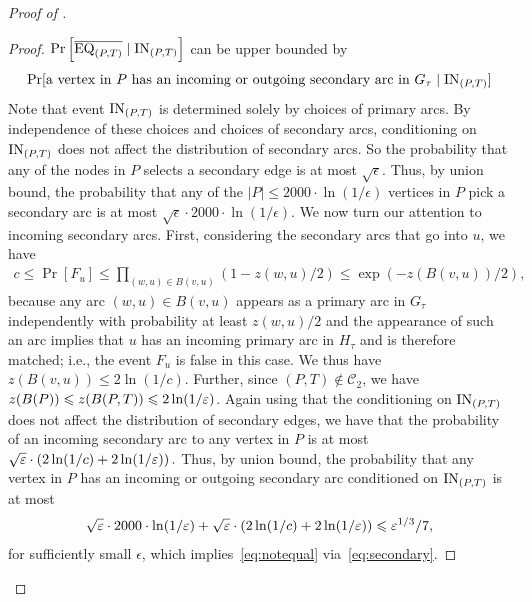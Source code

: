 \begin{proof}[Proof of ]
\begin{proof}
		$\Pr\left[\overline{\mathrm{EQ}_{(P,T)}}\mid \mathrm{IN}_{(P,T)}\right]$ can be upper bounded by
		\begin{align}
		\Pr[\mbox{a vertex in $P$ has an incoming or outgoing secondary arc in $G_\tau$} \mid \mathrm{IN}_{(P,T)}]
		\label{eq:secondary}
		\end{align}
		Note that event $\mathrm{IN}_{(P,T)}$ is determined solely by choices of primary arcs. By independence of these choices and choices of secondary arcs, conditioning on $\mathrm{IN}_{(P,T)}$ does not affect the distribution of secondary arcs. So the probability that any of the nodes in $P$ selects a secondary edge is at most $\sqrt{\epsilon}$. Thus, by union bound, the probability that any of the $|P|\leq 2000 \cdot \ln(1/\epsilon)$ vertices in $P$ pick a secondary arc is at most $\sqrt{\epsilon}\cdot 2000 \cdot \ln(1/\epsilon)$. We now turn our attention to incoming secondary arcs. First, considering the secondary arcs that go into $u$, we have 
		\begin{align*}
		c\leq \Pr[F_u] \leq  \prod_{(w,u)\in B(v,u)} \left( 1- z(w,u)/2 \right) \leq \exp(-z(B(v,u))/2),
		\end{align*}
		because any arc $(w,u)\in B(v,u)$ appears as a primary arc in $G_\tau$ independently with probability at least $z(w,u)/2$ and the appearance of such an arc implies that $u$ has an incoming primary arc in $H_\tau$ and is therefore matched; i.e., the event $F_u$ is false in this case. 
		We thus have $z(B(v,u)) \leq 2\ln(1/c)$.  Further, since $(P,T) \not \in \mathcal{C}_2$, we have $z(B(P)) \leqslant z(B(P,T)) \leqslant 2\ln(1/\varepsilon)$. Again using that the conditioning on $\mathrm{IN}_{(P,T)}$ does not affect the distribution of secondary edges, we have that the probability of an incoming secondary arc to any vertex in $P$ is at most $\sqrt{\varepsilon} \cdot \left( 2\ln(1/c) + 2\ln(1/\varepsilon) \right).$
		Thus, by union bound, the probability that any vertex in $P$ has an incoming or outgoing secondary arc conditioned on $\mathrm{IN}_{(P,T)}$ is at most 
		\begin{align*}
		\sqrt{\varepsilon}\cdot 2000 \cdot \ln(1/\varepsilon) +  \sqrt{\varepsilon} \cdot \left( 2\ln(1/c) + 2\ln(1/\varepsilon) \right) \leqslant \varepsilon^{1/3}/7,
		\end{align*}
		for sufficiently small $\epsilon$, which implies~\eqref{eq:notequal} via~\eqref{eq:secondary}.
		

\end{proof}
\end{proof}
